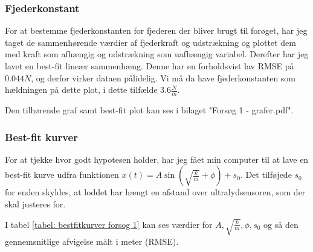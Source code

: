 \subsubsection{Fjederkonstant}\label{databehandling: tyk fjeder fjederkonstant}
For at bestemme fjederkonstanten for fjederen der bliver brugt til forøget, har jeg taget de sammenhørende værdier af fjederkraft og udstrækning og plottet dem med kraft som afhængig og udstrækning som uafhængig variabel. 
Derefter har jeg lavet en best-fit lineær sammenhæng. 
Denne har en forholdsvist lav RMSE på $0.044N$, og derfor virker dataen pålidelig. 
Vi må da have fjederkonstanten som hældningen på dette plot, i dette tilfælde $3.6\frac{N}{m}$.

Den tilhørende graf samt best-fit plot kan ses i bilaget "Forsøg 1 - grafer.pdf". 
 

\subsubsection{Best-fit kurver}\label{exp1: Best-fit kurver}
For at tjekke hvor godt hypotesen holder, har jeg fået min computer til at lave en best-fit kurve udfra funktionen $x(t)=A\sin (\sqrt{\frac{k}{m}}+\phi) + s_0$.
Det tilføjede $s_0$ for enden skyldes, at loddet har hængt en afstand over ultralydsensoren, som der skal justeres for. 

I tabel \ref{tabel: bestfitkurver forsog 1} kan ses værdier for $A, \sqrt{\frac{k}{m}}, \phi ,s_0$ og så den gennemsnitlige afvigelse målt i meter (RMSE).



